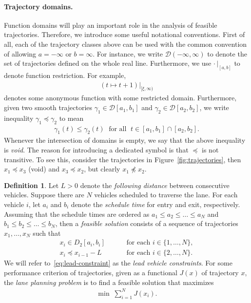 \documentclass[a4paper]{report}
\theoremstyle{definition}
\newtheorem{define}{Definition}[chapter]
\theoremstyle{plain}
\newcommand\halfopen[2]{\ensuremath{[#1,#2)}}
\begin{document}
\paragraph{Trajectory domains.}
Function domains will play an important role in the analysis of feasible
trajectories. Therefore, we introduce some useful notational conventions.
%
First of all, each of the trajectory classes above can be used with the common
convention of allowing $a = -\infty$ or $b = \infty$. For instance, we write
$\mathcal{D}(-\infty, \infty)$ to denote the set of trajectories defined on the
whole real line.
%
Furthermore, we use $\cdot\,|_{[a,b]}$ to denote function restriction. For example,
\begin{align*}
  (t \mapsto t + 1)|_{\halfopen{\xi}{\infty}}
\end{align*}
denotes some anonymous function with some restricted domain.
%
Furthermore, given two smooth trajectories $\gamma_{1} \in \mathcal{D}[a_{1}, b_{1}]$
and $\gamma_{2} \in \mathcal{D}[a_{2}, b_{2}]$, we write inequality
  $\gamma_{1} \preceq \gamma_{2}$ to mean
\begin{align*}
\gamma_{1}(t) \leq \gamma_{2}(t) \; \text{ for all } \; t \in [a_{1}, b_{1}] \cap [a_{2}, b_{2}] .
\end{align*}
%
Whenever the intersection of domains is empty, we say that the above inequality
is \emph{void}.
%
The reason for introducing a dedicated symbol is that $\preceq$ is not transitive.
To see this, consider the trajectories in Figure~\ref{fig:trajectories}, then
$x_{1} \preceq x_{3}$ (void) and $x_{3} \preceq x_{2}$, but clearly
$x_{1} \npreceq x_{2}$.

\begin{define}
  Let $L > 0$ denote the \textit{following distance} between consecutive vehicles.
  Suppose there are $N$ vehicles scheduled to traverse the lane. For each
  vehicle $i$, let $a_{i}$ and $b_{i}$ denote the \textit{schedule time} for entry and
  exit, respectively.
  Assuming that the schedule times are ordered as
  $a_{1} \leq a_{2} \leq \dots \leq a_{N}$ and
  $b_{1} \leq b_{2} \leq \dots \leq b_{N} $, then a \emph{feasible solution} consists
  of a sequence of trajectories $x_{1}, \dots, x_{N}$ such that
\begin{subequations}\label{eq:feasibility}
\begin{align}
x_{i} \in D_{2}[a_{i}, b_{i}] \quad \quad & \text{ for each } i \in \{1, \dots, N\}, \label{eq:second-order-constraint} \\
x_{i} \preceq x_{i-1} - L \quad \quad & \text{ for each } i \in \{2, \dots, N\} . \label{eq:lead-constraint}
\end{align}
\end{subequations}
We will refer to~\eqref{eq:lead-constraint} as the \emph{lead vehicle
  constraints}.
%
For some performance criterion of trajectories, given as a functional $J(x)$ of
trajectory $x$, the \emph{lane planning problem} is to find a feasible solution that
maximizes
\begin{align}\label{eq:objective}
  \min \; \sum_{i=1}^{N} J(x_{i}) .
\end{align}
\end{define}
\end{document}

